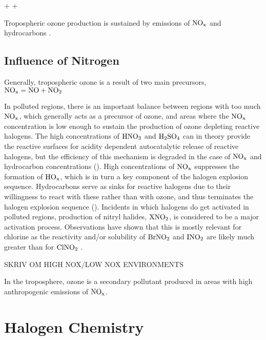 \begin{reaction}
     +  \rightarrow {} + 
    \label{rqn:o3no}
\end{reaction}

Tropospheric ozone production is sustained by emissions of $\mathrm{NO_x}$ and hydrocarbons \cite{Jacob1999}. 



\subsection{Influence of Nitrogen}\label{sec:influence_of_nitrogen}


Generally, tropospheric ozone is a result of two main precursors, $\mathrm{NO_x} = \mathrm{NO} + \mathrm{NO_2}$

In polluted regions, there is an important balance between regions with too much $\mathrm{NO_x}$, which generally acts as a precursor of ozone, and areas where the $\mathrm{NO_x}$ concentration is low enough to sustain the production of ozone depleting reactive halogens. The high concentrations of $\mathrm{HNO_3}$ and $\mathrm{H_2SO_4}$ can in theory provide the reactive surfaces for acidity dependent autocatalytic release of reactive halogens, but the efficiency of this mechanism is degraded in the case of $\mathrm{NO_x}$ and hydrocarbon concentrations (\cite{Simpson2015}). High concentrations of $\mathrm{NO_x}$ suppresses the formation of $\mathrm{HO_x}$, which is in turn a key component of the halogen explosion sequence. Hydrocarbons serve as sinks for reactive halogens due to their willingness to react with these rather than with ozone, and thus terminates the halogen explosion sequence (\cite{Simpson2015}). Incidents in which halogens do get activated in polluted regions, production of nitryl halides, $\mathrm{XNO_2}$, is considered to be a major activation process. Observations have shown that this is mostly relevant for chlorine as the reactivity and/or solubility of $\mathrm{BrNO_2}$ and $\mathrm{INO_2}$ are likely much greater than for $\mathrm{ClNO_2}$ \cite{Simpson2015}. 

\medskip





\cite{SeinfeldSpyros} SKRIV OM HIGH NOX/LOW NOX ENVIRONMENTS

In the troposphere, ozone is a secondary pollutant produced in areas with high anthropogenic emissions of $\mathrm{NO_x}$. 

\section{Halogen Chemistry}\label{sec:halogen_chemistry}


